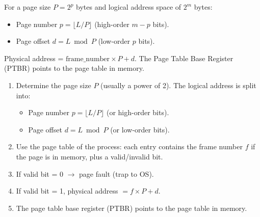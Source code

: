 \documentclass[11pt]{article}
\newcommand{\cle}[1]{{\popxbold\color{popdark}#1}}
\begin{document}
\begin{propriete}
For a page size $P = 2^p$ bytes and logical address space of $2^m$ bytes:
\begin{itemize}
\item \cle{Page number} $p = \lfloor L / P \rfloor$ (high-order $m-p$ bits).
\item \cle{Page offset} $d = L \bmod P$ (low-order $p$ bits).
\end{itemize}
Physical address = $\text{frame\_number} \times P + d$.
The \cle{Page Table Base Register (PTBR)} points to the page table in memory.
\end{propriete}

\begin{methode}
\begin{enumerate}
\item Determine the \cle{page size} $P$ (usually a power of 2). The logical address is split into:
\begin{itemize}
\item \cle{Page number} $p = \lfloor L / P \rfloor$ (or high-order bits).
\item \cle{Page offset} $d = L \bmod P$ (or low-order bits).
\end{itemize}
\item Use the \cle{page table} of the process: each entry contains the \cle{frame number} $f$ if the page is in memory, plus a \cle{valid/invalid bit}.
\item If valid bit = 0 $\rightarrow$ \cle{page fault} (trap to OS).
\item If valid bit = 1, physical address $ = f \times P + d$.
\item The page table base register (PTBR) points to the page table in memory.
\end{enumerate}
\end{methode}
\end{document}
